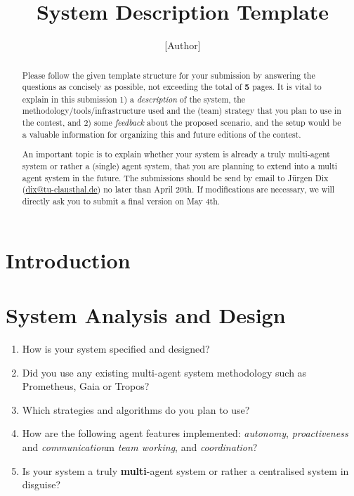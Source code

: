 \documentclass{llncs}
\begin{document}
\title{System Description Template}
\author{[Author]}
\institute{[Institute]}
 \maketitle
\begin{abstract}
Please follow the given template structure for your submission by
answering the questions as concisely as possible, not exceeding the
total of \textbf{5} pages. It is vital to explain in this submission
1) a \textit{description} of the 
system, the methodology/tools/infrastructure used
and the (team) strategy
that
you plan to use in the contest, 
and 2) some \textit{feedback} about %
the proposed scenario, and the setup would be a valuable information
for organizing this and future editions of the contest. 

An important
topic is to explain whether your system is already a truly
multi-agent system or rather a (single) agent system, that you are
planning to extend into a multi agent system in the future. The
submissions should be send by email to J\"urgen Dix 
(\url{dix@tu-clausthal.de}) no later
than April 20th. If modifications are necessary,
we will directly ask you to submit a final version on May 4th.
\end{abstract}


\section{Introduction}

\section{System Analysis and Design}

\begin{enumerate}
  \item How is your system  specified and designed?
  \item Did you use any existing multi-agent system
  methodology such as Prometheus, Gaia or Tropos?
  \item Which strategies and algorithms do you plan to use?
  \item How are the following agent features implemented:
  \emph{autonomy}, \emph{proactiveness}
  and \emph{communication}m \emph{team working}, and \emph{coordination}?
  \item Is your system a truly \textbf{multi}-agent system or
  rather a centralised system in disguise?
\end{enumerate}
\end{document}
